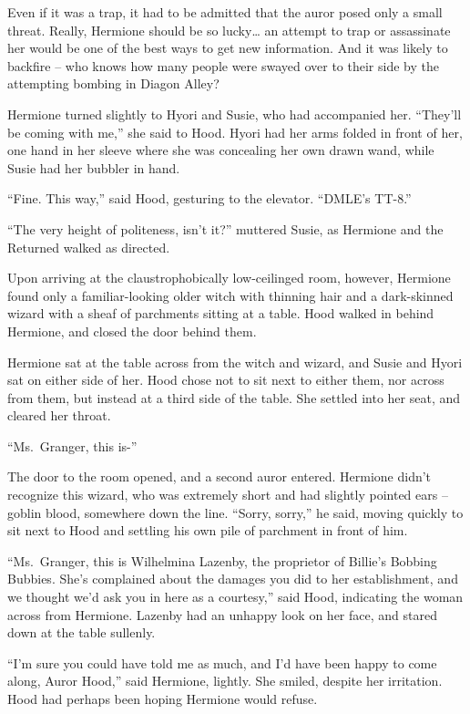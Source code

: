 Even if it was a trap, it had to be admitted that the auror posed only a
small threat. Really, Hermione should be so lucky\ldots{} an attempt to
trap or assassinate her would be one of the best ways to get new
information. And it was likely to backfire -- who knows how many people
were swayed over to their side by the attempting bombing in Diagon
Alley?

Hermione turned slightly to Hyori and Susie, who had accompanied her.
``They'll be coming with me,'' she said to Hood. Hyori had her arms
folded in front of her, one hand in her sleeve where she was concealing
her own drawn wand, while Susie had her bubbler in hand.

``Fine. This way,'' said Hood, gesturing to the elevator. ``DMLE's
TT-8.''

``The very height of politeness, isn't it?'' muttered Susie, as Hermione
and the Returned walked as directed.

Upon arriving at the claustrophobically low-ceilinged room, however,
Hermione found only a familiar-looking older witch with thinning hair
and a dark-skinned wizard with a sheaf of parchments sitting at a table.
Hood walked in behind Hermione, and closed the door behind them.

Hermione sat at the table across from the witch and wizard, and Susie
and Hyori sat on either side of her. Hood chose not to sit next to
either them, nor across from them, but instead at a third side of the
table. She settled into her seat, and cleared her throat.

``Ms.~Granger, this is-''

The door to the room opened, and a second auror entered. Hermione didn't
recognize this wizard, who was extremely short and had slightly pointed
ears -- goblin blood, somewhere down the line. ``Sorry, sorry,'' he
said, moving quickly to sit next to Hood and settling his own pile of
parchment in front of him.

``Ms.~Granger, this is Wilhelmina Lazenby, the proprietor of Billie's
Bobbing Bubbies. She's complained about the damages you did to her
establishment, and we thought we'd ask you in here as a courtesy,'' said
Hood, indicating the woman across from Hermione. Lazenby had an unhappy
look on her face, and stared down at the table sullenly.

``I'm sure you could have told me as much, and I'd have been happy to
come along, Auror Hood,'' said Hermione, lightly. She smiled, despite
her irritation. Hood had perhaps been hoping Hermione would refuse.

